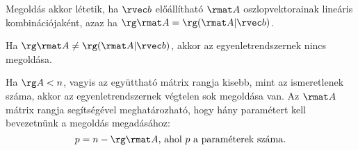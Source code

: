 \documentclass[a4paper, 12pt]{scrartcl}
\begin{document}
\begin{blueBox}

  Megoldás akkor létetik, ha $\rvec b$ előállítható $\rmat A$ oszlopvektorainak
  lineáris kombinációjaként, azaz ha $\rg \rmat A = \rg (\rmat A | \rvec b)$.

  Ha $\rg \rmat A \neq \rg (\rmat A | \rvec b)$, akkor az egyenletrendszernek
  nincs megoldása.

  Ha $\rg A < n$, vagyis az együttható mátrix rangja kisebb, mint az
  ismeretlenek száma, akkor az egyenletrendszernek végtelen sok
  megoldása van. Az $\rmat A$ mátrix rangja segítségével meghatározható,
  hogy hány paramétert kell bevezetnünk a megoldás megadásához:
  $$
    p = n - \rg \rmat A
    \text{, ahol $p$ a paraméterek száma.}
  $$
\end{blueBox}
\end{document}
